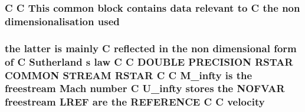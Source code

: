 \hypertarget{stream_8com_a3291a21585d0aec360cd82d75bf51496}{
\subsubsection[{used}]{\setlength{\rightskip}{0pt plus 5cm}C C This common block contains data relevant to C the non {\bf dimensionalisation} used}}\label{stream_8com_a3291a21585d0aec360cd82d75bf51496}
\hypertarget{stream_8com_a4acbada976d4b32776408b1d1e55321a}{
\subsubsection[{velocity}]{\setlength{\rightskip}{0pt plus 5cm}the latter is mainly C reflected in the non dimensional form of C Sutherland s law C C D\-O\-U\-B\-L\-E P\-R\-E\-C\-I\-S\-I\-O\-N R\-S\-T\-A\-R C\-O\-M\-M\-O\-N S\-T\-R\-E\-A\-M R\-S\-T\-A\-R C C {\bf M\-\_\-infty} is the freestream Mach number C {\bf U\-\_\-infty} stores the N\-O\-F\-V\-A\-R freestream {\bf L\-R\-E\-F} {\bf are} the R\-E\-F\-E\-R\-E\-N\-C\-E C C velocity}}\label{stream_8com_a4acbada976d4b32776408b1d1e55321a}
